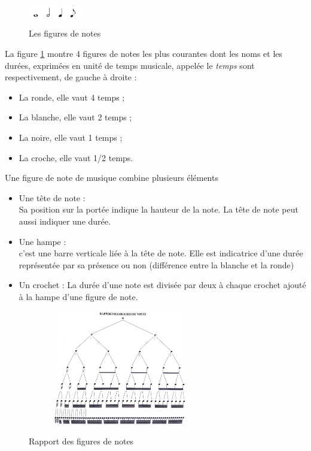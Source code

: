 \begin{figure}[h]
	\centering
	\includegraphics[height=10mm, width=25mm]{
    z_images/3_methodes/0_notation_de_la_batterie/0_figures_de_notes.png}
    \caption{Les figures de notes}
    \label{4_notes}
\end{figure}
La figure \ref{4_notes} montre 4 figures de notes les plus courantes dont les
noms et les durées, exprimées en unité de temps musicale, appelée le
\emph{temps} sont respectivement, de gauche à droite :
\begin{itemize}
    \item La ronde, elle vaut 4 temps ;
    \item La blanche, elle vaut 2 temps ;
    \item La noire, elle vaut 1 temps ;
    \item La croche, elle vaut 1/2 temps.
\end{itemize}
Une figure de note \cite{danhauser} de musique combine plusieurs éléments
\cite{gould2016behind}
\begin{itemize}
	\item Une tête de note :\\
	Sa position sur la portée indique la hauteur de la note. La tête de note
    peut aussi indiquer une durée.
	\item Une hampe :\\
	c’est une barre verticale liée à la tête de note. Elle est indicatrice
    d’une durée représentée par sa présence ou non (différence entre la blanche
    et la ronde)
	\item Un crochet : La durée d’une note est divisée par deux à chaque
     crochet ajouté à la hampe d’une figure de note.\\
\end{itemize}
\begin{figure}[h]
	\centering
	\includegraphics[height=50mm, width=80mm]{
    z_images/3_methodes/0_notation_de_la_batterie/1_rapport_figures_notes.png}
	\caption{Rapport des figures de notes}\cite{danhauser}
	\label{rapp_fig_notes}
\end{figure}

